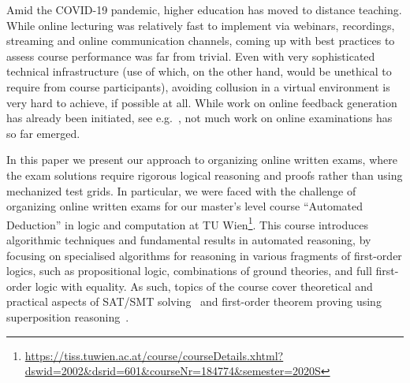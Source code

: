 Amid the COVID-19 pandemic, higher education has moved to distance
teaching. While online lecturing was relatively fast to implement via
webinars, recordings,  streaming and online communication channels,
coming up with best practices to assess course performance was far
from trivial. Even with very sophisticated technical infrastructure
(use of which, on the other hand, would be unethical to require from course
participants), avoiding collusion in a virtual
environment is very hard to achieve, if possible at all.
While work on
online feedback generation has already been initiated, see
e.g.~\cite{Zuleger18,Wang18}, 
not much work on online examinations has so far emerged. 

In this paper we present our approach to organizing online
written exams, where the exam solutions require rigorous
logical reasoning and proofs rather than using mechanized test grids.
In particular, we were faced with the challenge of organizing online
written exams for our master's level course ``Automated
Deduction'' in logic and computation at TU
Wien\footnote{\url{https://tiss.tuwien.ac.at/course/courseDetails.xhtml?dswid=2002\&dsrid=601\&courseNr=184774\&semester=2020S}}.
This course introduces algorithmic techniques and fundamental results
in automated reasoning, by focusing on specialised algorithms for
reasoning in various fragments of first-order logics, such as
propositional logic, combinations of ground theories, and full
first-order logic with equality.
As such, topics of the course cover theoretical and practical
aspects of SAT/SMT solving~\cite{DPLL,Tinelli02,DPLLT} and first-order theorem proving using
superposition reasoning~\cite{Rubio01,Vampire13}.

